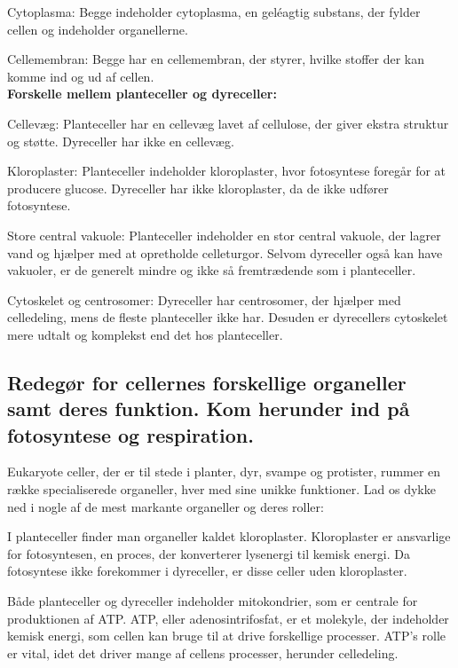             Cytoplasma: Begge indeholder cytoplasma, en geléagtig substans, der fylder cellen og indeholder organellerne.

            Cellemembran: Begge har en cellemembran, der styrer, hvilke stoffer der kan komme ind og ud af cellen. \\
            \textbf{Forskelle mellem planteceller og dyreceller:}\newline

            Cellevæg: Planteceller har en cellevæg lavet af cellulose, der giver ekstra struktur og støtte. Dyreceller har ikke en cellevæg.

            Kloroplaster: Planteceller indeholder kloroplaster, hvor fotosyntese foregår for at producere glucose. Dyreceller har ikke kloroplaster, da de ikke udfører fotosyntese.

            Store central vakuole: Planteceller indeholder en stor central vakuole, der lagrer vand og hjælper med at opretholde celleturgor. Selvom dyreceller også kan have vakuoler, er de generelt mindre og ikke så fremtrædende som i planteceller.

            Cytoskelet og centrosomer: Dyreceller har centrosomer, der hjælper med celledeling, mens de fleste planteceller ikke har. Desuden er dyrecellers cytoskelet mere udtalt og komplekst end det hos planteceller.

    \subsection*{Redegør for cellernes forskellige organeller samt deres funktion. Kom herunder ind på fotosyntese og respiration.}
        Eukaryote celler, der er til stede i planter, dyr, svampe og protister, rummer en række specialiserede organeller, hver med sine unikke funktioner. Lad os dykke ned i nogle af de mest markante organeller og deres roller:

        I planteceller finder man organeller kaldet kloroplaster. Kloroplaster er ansvarlige for fotosyntesen, en proces, der konverterer lysenergi til kemisk energi. Da fotosyntese ikke forekommer i dyreceller, er disse celler uden kloroplaster.
        
        Både planteceller og dyreceller indeholder mitokondrier, som er centrale for produktionen af ATP. ATP, eller adenosintrifosfat, er et molekyle, der indeholder kemisk energi, som cellen kan bruge til at drive forskellige processer. ATP's rolle er vital, idet det driver mange af cellens processer, herunder celledeling.
        
